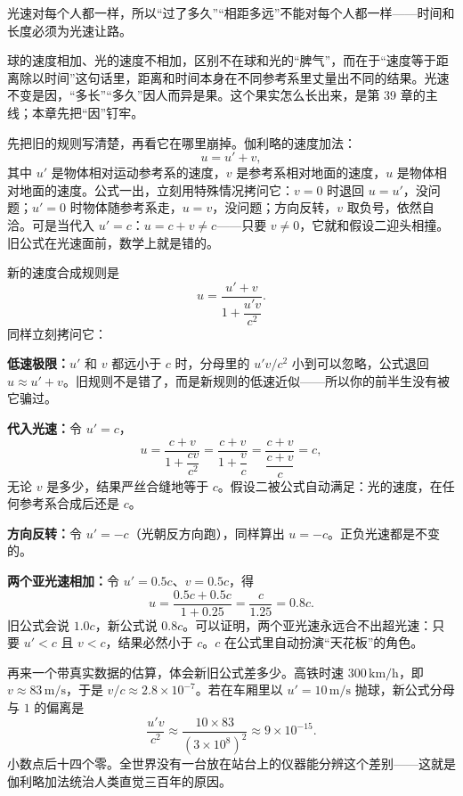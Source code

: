 
\begin{oneline}
光速对每个人都一样，所以“过了多久”“相距多远”不能对每个人都一样——时间和长度必须为光速让路。
\end{oneline}

球的速度相加、光的速度不相加，区别不在球和光的“脾气”，而在于“速度等于距离除以时间”这句话里，距离和时间本身在不同参考系里丈量出不同的结果。光速不变是因，“多长”“多久”因人而异是果。这个果实怎么长出来，是第 39 章的主线；本章先把“因”钉牢。


先把旧的规则写清楚，再看它在哪里崩掉。伽利略的速度加法：
\[
u=u'+v,
\]
其中 \(u'\) 是物体相对运动参考系的速度，\(v\) 是参考系相对地面的速度，\(u\) 是物体相对地面的速度。公式一出，立刻用特殊情况拷问它：\(v=0\) 时退回 \(u=u'\)，没问题；\(u'=0\) 时物体随参考系走，\(u=v\)，没问题；方向反转，\(v\) 取负号，依然自洽。可是当代入 \(u'=c\)：\(u=c+v\ne c\)——只要 \(v\ne0\)，它就和假设二迎头相撞。旧公式在光速面前，数学上就是错的。

新的速度合成规则是
\[
u=\frac{u'+v}{1+\dfrac{u'v}{c^{2}}}.
\]
同样立刻拷问它：

\textbf{低速极限：}\(u'\) 和 \(v\) 都远小于 \(c\) 时，分母里的 \(u'v/c^{2}\) 小到可以忽略，公式退回 \(u\approx u'+v\)。旧规则不是错了，而是新规则的低速近似——所以你的前半生没有被它骗过。

\textbf{代入光速：}令 \(u'=c\)，
\[
u=\frac{c+v}{1+\dfrac{cv}{c^{2}}}=\frac{c+v}{1+\dfrac{v}{c}}
=\frac{c+v}{\dfrac{c+v}{c}}=c,
\]
无论 \(v\) 是多少，结果严丝合缝地等于 \(c\)。假设二被公式自动满足：光的速度，在任何参考系合成后还是 \(c\)。

\textbf{方向反转：}令 \(u'=-c\)（光朝反方向跑），同样算出 \(u=-c\)。正负光速都是不变的。

\textbf{两个亚光速相加：}令 \(u'=0.5c\)、\(v=0.5c\)，得
\[
u=\frac{0.5c+0.5c}{1+0.25}=\frac{c}{1.25}=0.8c.
\]
旧公式会说 \(1.0c\)，新公式说 \(0.8c\)。可以证明，两个亚光速永远合不出超光速：只要 \(u'<c\) 且 \(v<c\)，结果必然小于 \(c\)。\(c\) 在公式里自动扮演“天花板”的角色。

再来一个带真实数据的估算，体会新旧公式差多少。高铁时速 \(300\,\mathrm{km/h}\)，即 \(v\approx83\,\mathrm{m/s}\)，于是 \(v/c\approx2.8\times10^{-7}\)。若在车厢里以 \(u'=10\,\mathrm{m/s}\) 抛球，新公式分母与 \(1\) 的偏离是
\[
\frac{u'v}{c^{2}}\approx\frac{10\times83}{(3\times10^{8})^{2}}\approx9\times10^{-15}.
\]
小数点后十四个零。全世界没有一台放在站台上的仪器能分辨这个差别——这就是伽利略加法统治人类直觉三百年的原因。

